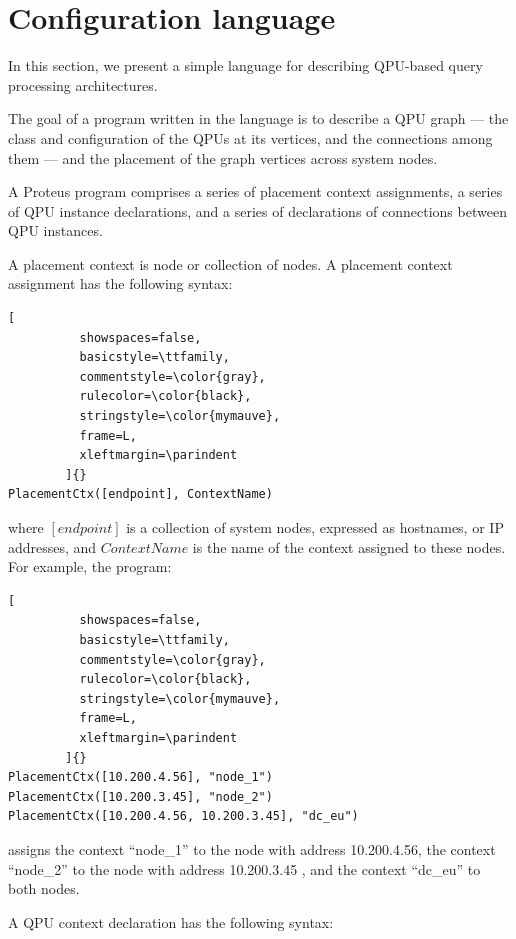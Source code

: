 \section{Configuration language}

In this section, we present a simple language for describing QPU-based query processing architectures.

The goal of a program written in the language is to describe a QPU graph
--- the class and configuration of the QPUs at its vertices, and the connections among them ---
and the placement of the graph vertices across system nodes.

A Proteus program comprises a series of placement context assignments,
a series of QPU instance declarations, and a series of declarations of connections between QPU instances.

A placement context is node or collection of nodes.
A placement context assignment has the following syntax:

\begin{lstlisting}[
          showspaces=false,
          basicstyle=\ttfamily,
          commentstyle=\color{gray},
          rulecolor=\color{black},
          stringstyle=\color{mymauve},
          frame=L,
          xleftmargin=\parindent
        ]{}
PlacementCtx([endpoint], ContextName)
\end{lstlisting}

\noindent
where $[endpoint]$ is a collection of system nodes, expressed as hostnames, or IP addresses,
and $ContextName$ is the name of the context assigned to these nodes.
For example, the program:

\begin{lstlisting}[
          showspaces=false,
          basicstyle=\ttfamily,
          commentstyle=\color{gray},
          rulecolor=\color{black},
          stringstyle=\color{mymauve},
          frame=L,
          xleftmargin=\parindent
        ]{}
PlacementCtx([10.200.4.56], "node_1")
PlacementCtx([10.200.3.45], "node_2")
PlacementCtx([10.200.4.56, 10.200.3.45], "dc_eu")
\end{lstlisting}

\noindent
assigns the context ``node\_1'' to the node with address 10.200.4.56,
the context ``node\_2'' to  the node with address 10.200.3.45 ,
and the context ``dc\_eu'' to both nodes.

\medskip
\noindent
A QPU context declaration has the following syntax:



